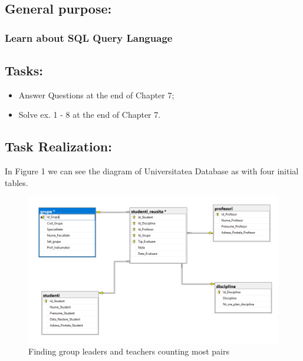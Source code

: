 \documentclass[12pt]{article}
\begin{document}
        \pagebreak
        \subsection*{ General purpose:}
        \subsubsection*{ Learn about SQL Query Language}
        
        \subsection*{Tasks:}
        \begin{itemize}
                \item Answer Questions at the end of Chapter 7;
                \item Solve ex. 1 - 8 at the end of Chapter 7.

                
        \end{itemize}
        \subsection*{Task Realization:}
        In Figure 1 we can see the diagram of Universitatea Database as  with four initial tables.
        \begin{figure}[H]
                \centering
                \includegraphics[width=\textwidth]{img1.png}
                \caption{Finding group leaders and teachers counting most pairs}
        \end{figure}
        \vspace{0.5 cm}
        
\end{document}
